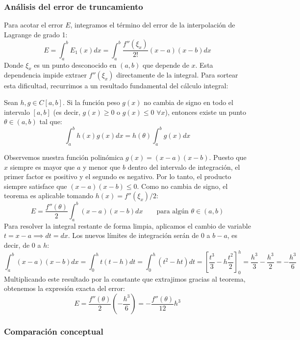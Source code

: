 \subsubsection{Análisis del error de truncamiento}

Para acotar el error $E$, integramos el término del error de la interpolación de Lagrange de grado 1:
\[
    E = \int_a^b E_1(x) dx = \int_a^b \frac{f''(\xi_x)}{2!} (x - a)(x - b) dx
\]
Donde $\xi_x$ es un punto desconocido en $(a, b)$ que depende de $x$. Esta dependencia impide extraer $f''(\xi_x)$ directamente de la integral. Para sortear esta dificultad, recurrimos a un resultado fundamental del cálculo integral:

\begin{teorema}
    Sean $h, g \in C[a,b]$. Si la función peso $g(x)$ no cambia de signo en todo el intervalo $[a,b]$ (es decir, $g(x) \geq 0$ o $g(x) \leq 0 \,\, \forall x$), entonces existe un punto $\theta \in (a,b)$ tal que:
    \[
        \int_a^b h(x)g(x) dx = h(\theta) \int_a^b g(x) dx
    \]
\end{teorema}

Observemos nuestra función polinómica $g(x) = (x-a)(x-b)$. Puesto que $x$ siempre es mayor que $a$ y menor que $b$ dentro del intervalo de integración, el primer factor es positivo y el segundo es negativo. Por lo tanto, el producto siempre satisface que $(x-a)(x-b) \leq 0$. Como no cambia de signo, el teorema es aplicable tomando $h(x) = f''(\xi_x)/2$:
\[
    E = \frac{f''(\theta)}{2} \int_a^b (x - a)(x - b) dx \qquad \text{para algún } \theta \in (a, b)
\]
Para resolver la integral restante de forma limpia, aplicamos el cambio de variable $t = x - a \implies dt = dx$. Los nuevos límites de integración serán de $0$ a $b-a$, es decir, de $0$ a $h$:
\[
    \int_a^b (x - a)(x - b) dx = \int_0^h t (t - h) dt = \int_0^h (t^2 - ht) dt = \left[ \frac{t^3}{3} - h\frac{t^2}{2} \right]_0^h = \frac{h^3}{3} - \frac{h^3}{2} = -\frac{h^3}{6}
\]
Multiplicando este resultado por la constante que extrajimos gracias al teorema, obtenemos la expresión exacta del error:
\[
    E = \frac{f''(\theta)}{2} \left( -\frac{h^3}{6} \right) = \boxed{-\frac{f''(\theta)}{12} h^3}
\]

\subsubsection{Comparación conceptual}

